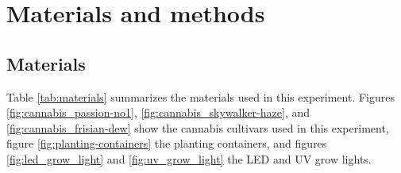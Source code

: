 \section{Materials and methods}

\subsection{Materials}

Table \ref{tab:materials} summarizes the materials used in this experiment. Figures \ref{fig:cannabis_passion-no1}, \ref{fig:cannabis_skywalker-haze}, and \ref{fig:cannabis_frisian-dew} show the cannabis cultivars used in this experiment, figure \ref{fig:planting-containers} the planting containers, and figures \ref{fig:led_grow_light} and \ref{fig:uv_grow_light} the LED and UV grow lights.

